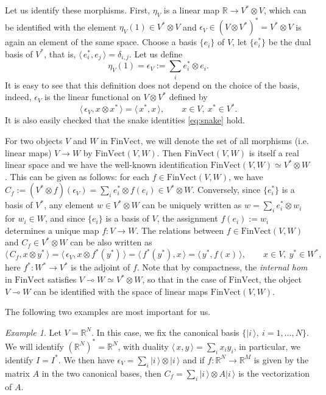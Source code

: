 \documentclass[12pt]{article}
\theoremstyle{definition}
\theoremstyle{remark}
\newtheorem{exm}{Example}
\def\<{\langle\,}
\def\>{\,\rangle}
\def \FV{\mathrm{FinVect}}
\begin{document}
Let us identify these morphisms.
First, $\eta_V$ is a linear map $\mathbb R\to V^*\otimes V$, which can be
identified with the element $\eta_V(1)\in V^*\otimes V$ and   $\epsilon_V\in (V\otimes
V^*)^*=V^*\otimes V$ is again an element of the same space.  Choose a basis
$\{e_i\}$ of $V$, let $\{e_i^*\}$ be the dual basis of $V^*$, that is,
$\<e_i^*,e_j\>=\delta_{i,j}$. Let us define
\[
\eta_V(1)=\epsilon_V:=\sum_i e_i^*\otimes e_i.
\]
It is easy to see that this definition does not depend on the choice of the basis, indeed,
$\epsilon_V$ is the linear functional on $V\otimes V^*$ defined by
\[
\<\epsilon_V, x\otimes x^*\>=\<x^*,x\>,\qquad x\in V, \ x^*\in V^*.
\]
It is also easily checked that the snake identities \eqref{eq:snake} hold.

For two objects $V$ and $W$ in $\FV$, we will denote the set of all morphisms (i.e. linear
maps) $V\to
W$ by $\FV(V,W)$. Then $\FV(V,W)$ is itself a real linear space and  we have the well-known identification 
$\FV(V,W)\simeq V^*\otimes W$. This can be given as follows: for each $f\in \FV(V,W)$, we have 
$C_f:=(V^*\otimes f)(\epsilon_V)=\sum_i e_i^*\otimes f(e_i)\in V^*\otimes W$. Conversely,
since $\{e_i^*\}$ is a basis of $V^*$, 
any element $w\in V^*\otimes W$ can be uniquely written as $w=\sum_i e_i^*\otimes w_i$ for
$w_i\in W$, and since $\{e_i\}$ is a basis of $V$, the assignment $f(e_i):=w_i$ determines a
unique map $f:V\to W$. The relations between $f\in \FV(V,W)$ and $C_f\in V^*\otimes W$ can
be also written as
\[
\<C_f,x\otimes y^*\>=\<\epsilon_V,x\otimes f^*(y^*)\>=\<f^*(y^*),x\>=\<y^*,f(x)\>,\qquad x\in
V,\ y^*\in W^*,
\]
here $f^*:W^*\to V^*$ is the adjoint of $f$.
Note that by compactness, the {\em internal hom} in $\FV$ satisfies $V\multimap W\simeq V^*\otimes W$,
so that  in the case of $\FV$, the object $V\multimap W$ can be identified with the space of linear
maps $\FV(V,W)$. 

The following two examples  are most important for us.

\begin{exm}\label{exm:classical} Let $V=\mathbb R^N$. In this case, we fix the canonical basis $\{|i\>,\
i=1,\dots,N\}$. We will identify $(\mathbb R^N)^*=\mathbb R^N$, with duality
$\<x,y\>=\sum_i x_iy_i$, in particular, we identify $I=I^*$. We then have
$\epsilon_V=\sum_i |i\>\otimes |i\>$ and if $f:\mathbb R^N\to \mathbb R^M$ is given by the
matrix $A$ in the two canonical bases, then  $C_f=\sum_i |i\>\otimes A|i\>$ is the
vectorization of $A$.

\end{exm}
\end{document}
